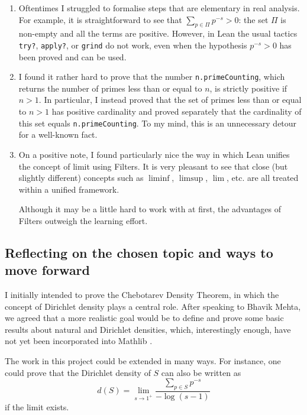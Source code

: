 \documentclass[a4paper,11pt]{article}
\theoremstyle{plain}
\begin{document}
	\begin{enumerate}

		\item Oftentimes I struggled to formalise steps that are elementary in real analysis. For example, it is straightforward to see that $\sum_{p\in \Pi}p^{-s}>0$: the set $\Pi$ is non-empty and all the terms are positive. However, in Lean the usual tactics \lstinline|try?|, \lstinline|apply?|, or \lstinline|grind| do not work, even when the hypothesis $p^{-s}>0$ has been proved and can be used. 

		\item I found it rather hard to prove that the number \lstinline|n.primeCounting|, which returns the number of primes less than or equal to $n$, is strictly positive if $n>1$. In particular, I instead proved that the set of primes less than or equal to $n>1$ has positive cardinality and proved separately that the cardinality of this set equals \lstinline|n.primeCounting|. To my mind, this is an unnecessary detour for a well-known fact.

        \item On a positive note, I found particularly nice the way in which Lean unifies the concept of limit using Filters. It is very pleasant to see that close (but slightly different) concepts such as $\liminf$, $\limsup$, $\lim$, etc. are all treated within a unified framework.

        Although it may be a little hard to work with at first, the advantages of Filters outweigh the learning effort.

		\end{enumerate}

	\subsection{Reflecting on the chosen topic and ways to move forward}

    I initially intended to prove the Chebotarev Density Theorem, in which the concept of Dirichlet density plays a central role. After speaking to Bhavik Mehta, we agreed that a more realistic goal would be to define and prove some basic results about natural and Dirichlet densities, which, interestingly enough, have not yet been incorporated into Mathlib \cite{Mathlib}.

    The work in this project could be extended in many ways. For instance, one could prove that the Dirichlet density of $S$ can also be written as
    \begin{equation}\label{eq:Dirichletdensfinal}
    	d(S)=\lim_{s\rightarrow1^+}\frac{\sum_{p\in S}p^{-s}}{-\log(s-1)}
    \end{equation}
    if the limit exists.
\end{document}
